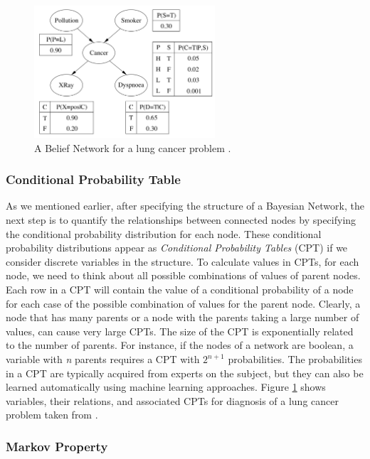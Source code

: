\documentclass[11pt]{article}
\begin{document}
\begin{figure}[tbh]
  \center
  \includegraphics[width=0.6\textwidth]{figure/bbn.png}
  \caption{A Belief Network for a lung cancer problem
  \cite{korb:bayesian-ai}.}
  \label{fig:bbn}
\end{figure}

\subsubsection{Conditional Probability Table}

As we mentioned earlier, after specifying the structure of a Bayesian
Network, the next step is to quantify the relationships between connected nodes
by specifying the conditional probability distribution for each node. These
conditional probability distributions appear as \textit{Conditional Probability
Tables} (CPT) if we consider discrete variables in the structure. To calculate
values in CPTs, for each node, we need to think about all possible combinations
of values of parent nodes. Each row in a CPT will contain the value of a
conditional probability of a node for each case of the possible combination of
values for the parent node. Clearly, a node that has many parents or a node with
the parents taking a large number of values, can cause very large CPTs. The size
of the CPT is exponentially related to the number of parents. For instance, if
the nodes of a network are boolean, a variable with \textit{n} parents requires
a CPT with $2^{n+1}$ probabilities. The probabilities in a CPT are typically
acquired from experts on the subject, but they can also be learned automatically
using machine learning approaches. Figure \ref{fig:bbn} shows variables, their
relations, and associated CPTs for diagnosis of a lung cancer problem taken from
\cite{korb:bayesian-ai}.

\subsubsection{Markov Property}
\label{sec:markov-property}
\end{document}
